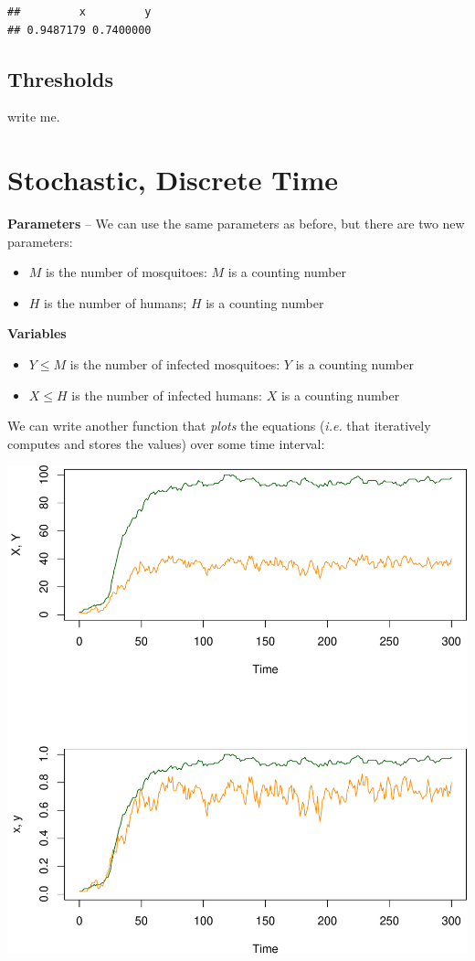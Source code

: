 \documentclass[
]{book}
\begin{document}
\begin{verbatim}
##         x         y 
## 0.9487179 0.7400000
\end{verbatim}

\subsection{Thresholds}\label{thresholds-1}

write me.

\section{Stochastic, Discrete Time}\label{sdtsRoss}

\textbf{Parameters} -- We can use the same parameters as before, but there are two new parameters:

\begin{itemize}
\item
  \(M\) is the number of mosquitoes: \(M\) is a counting number
\item
  \(H\) is the number of humans; \(H\) is a counting number
\end{itemize}

\textbf{Variables}

\begin{itemize}
\item
  \(Y \leq M\) is the number of infected mosquitoes: \(Y\) is a counting number
\item
  \(X \leq H\) is the number of infected humans: \(X\) is a counting number
\end{itemize}

We can write another function that \emph{plots} the equations (\emph{i.e.} that iteratively computes and stores the values) over some time interval:

\includegraphics{docs/figs/unnamed-chunk-49-1.pdf}
\end{document}
